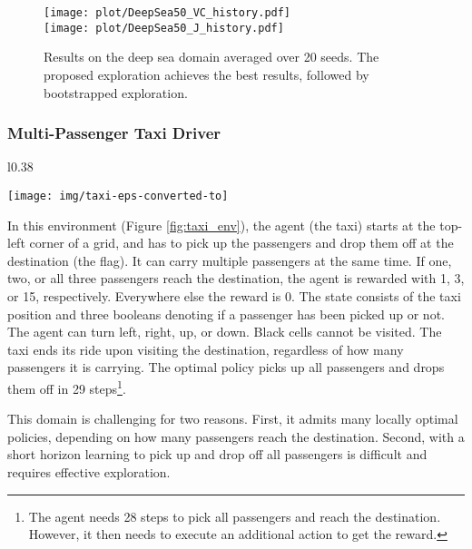 \documentclass{article}
\begin{document}
\begin{figure}[t]
	\centering
	\texttt{[image: plot/DeepSea50\_VC\_history.pdf]}
	\\[0.5em]
	\texttt{[image: plot/DeepSea50\_J\_history.pdf]}
	\caption{\label{fig:deepsea_res}Results on the deep sea domain averaged over 20 seeds.
	The proposed exploration achieves the best results, followed by bootstrapped exploration.}
\end{figure}

\clearpage

\subsubsection{Multi-Passenger Taxi Driver}
\label{sssec:taxi}
\begin{wrapfigure}{l}{0.38\textwidth}
	\begin{center}
		\vspace*{-0.7cm}
		\texttt{[image: img/taxi-eps-converted-to]}
	\end{center}
	\vspace*{-0.5cm}
	\caption{The taxi driver.}
	\label{fig:taxi_env}
	\vspace*{-0.5cm}
\end{wrapfigure}In this environment (Figure \ref{fig:taxi_env}), the agent (the taxi) starts at the top-left corner of a grid, and has to pick up the passengers and drop them off at the destination (the flag). It can carry multiple passengers at the same time. If one, two, or all three passengers reach the destination, the agent is rewarded with 1, 3, or 15, respectively. Everywhere else the reward is 0. 
The state consists of the taxi position and three booleans denoting if a passenger has been picked up or not. The agent can turn left, right, up, or down. Black cells cannot be visited. 
The taxi ends its ride upon visiting the destination, regardless of how many passengers it is carrying.
The optimal policy picks up all passengers and drops them off in 29 steps\footnote{The agent needs 28 steps to pick all passengers and reach the destination. However, it then needs to execute an additional action to get the reward.}.

This domain is challenging for two reasons. First, it admits many locally optimal policies, depending on how many passengers reach the destination. Second, with a short horizon learning to pick up and drop off all passengers is difficult and requires effective exploration.
\end{document}
